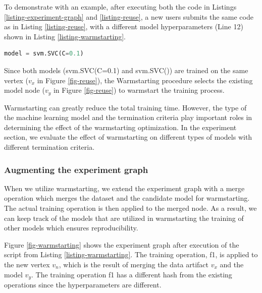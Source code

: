 To demonstrate with an example, after executing both the code in Listings \ref{listing-experiment-graph} and \ref{listing-reuse}, a new users submits the same code as in Listing \ref{listing-reuse}, with a different model hyperparameters (Line 12) shown in Listing \ref{listing-warmstarting}.
\begin{lstlisting}[language=Python, firstnumber=12, caption= Workload with different hyperparameters,captionpos=b,label = {listing-warmstarting}]
model = svm.SVC(C=0.1)
\end{lstlisting}
Since both models (svm.SVC(C=0.1) and svm.SVC()) are trained on the same vertex ($v_x$ in Figure \ref{fig-reuse}), the Warmstarting procedure selects the existing model node ($v_y$ in Figure \ref{fig-reuse}) to warmstart the training process.

Warmstarting can greatly reduce the total training time.
However, the type of the machine learning model and the termination criteria play important roles in determining the effect of the warmstarting optimization.
In the experiment section, we evaluate the effect of warmstarting on different types of models with different termination criteria.

\subsubsection{Augmenting the experiment graph}
When we utilize warmstarting, we extend the experiment graph with a merge operation which merges the dataset and the candidate model for warmstarting.
The actual training operation is then applied to the merged node.
As a result, we can keep track of the models that are utilized in warmstarting the training of other models which ensures reproducibility.

Figure \ref{fig-warmstarting} shows the experiment graph after execution of the script from Listing \ref{listing-warmstarting}.
The training operation, f1, is applied to the new vertex $v_n$, which is the result of merging the data artifact $v_x$ and the model $v_y$.
The training operation f1 has a different hash from the existing operations since the hyperparameters are different.

